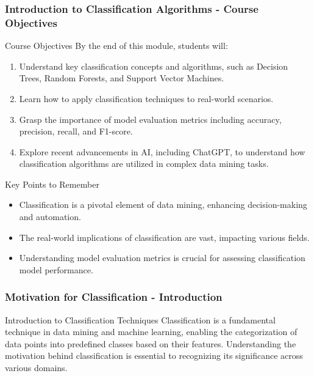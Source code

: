 \documentclass[aspectratio=169]{beamer}
\begin{document}
\begin{frame}[fragile]
    \frametitle{Introduction to Classification Algorithms - Course Objectives}
    \begin{block}{Course Objectives}
        By the end of this module, students will:
        \begin{enumerate}
            \item Understand key classification concepts and algorithms, such as Decision Trees, Random Forests, and Support Vector Machines.
            \item Learn how to apply classification techniques to real-world scenarios.
            \item Grasp the importance of model evaluation metrics including accuracy, precision, recall, and F1-score.
            \item Explore recent advancements in AI, including ChatGPT, to understand how classification algorithms are utilized in complex data mining tasks.
        \end{enumerate}
    \end{block}

    \begin{block}{Key Points to Remember}
        \begin{itemize}
            \item Classification is a pivotal element of data mining, enhancing decision-making and automation.
            \item The real-world implications of classification are vast, impacting various fields.
            \item Understanding model evaluation metrics is crucial for assessing classification model performance.
        \end{itemize}
    \end{block}
\end{frame}

\begin{frame}[fragile]
    \frametitle{Motivation for Classification - Introduction}
    \begin{block}{Introduction to Classification Techniques}
        Classification is a fundamental technique in data mining and machine learning, enabling the categorization of data points into predefined classes based on their features. Understanding the motivation behind classification is essential to recognizing its significance across various domains.
    \end{block}
\end{frame}
\end{document}
